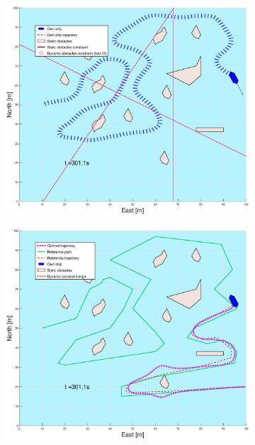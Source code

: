 \begin{figure}[ht]\ContinuedFloat
    \begin{subfigure}[b]{0.49\textwidth}
        \centering
        \includegraphics[width=\textwidth]{Images/Figures/skjergard_u_trafikk/_Simple_1fig1_time=301}
    \end{subfigure}
    \hfill
    \begin{subfigure}[b]{0.499\textwidth}
        \centering
        \includegraphics[width=\textwidth]{Images/Figures/skjergard_u_trafikk/_Simple_1fig999_time=301}

\end{subfigure}
\end{figure}

